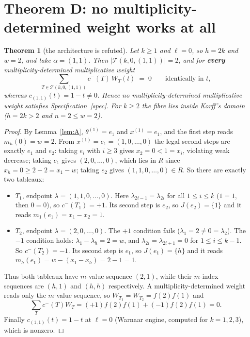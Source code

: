 \documentclass[11pt]{article}
\theoremstyle{plain}
\newtheorem{theorem}{Theorem}
\theoremstyle{definition}
\theoremstyle{remark}
\newcommand{\cm}{c^{-}}
\begin{document}
\section{Theorem D: no multiplicity-determined weight works at all}

\begin{theorem}[the architecture is refuted]\label{thm:D}
Let $k\geq1$ and $\ell=0$, so $h=2k$ and $w=2$, and take $\alpha=(1,1)$. Then
$|\mathcal{T}(k,0,(1,1))|=2$, and for \textbf{every} multiplicity-determined multiplicative
weight
\[
\sum_{T\in\mathcal{T}(k,0,(1,1))}\cm(T)\,W_T(t)\;=\;0\qquad\text{identically in }t,
\]
whereas $c_{(1,1)}(t)=1-t\neq0$. Hence no multiplicity-determined multiplicative weight
satisfies Specification~\ref{spec}. For $k\geq2$ the fibre lies inside Korff's domain
($h=2k>2$ and $n=2\leq w=2$).
\end{theorem}

\begin{proof}
By Lemma~\ref{lem:A}, $\theta^{(1)}=e_1$ and $x^{(1)}=e_1$, and the first step reads
$m_h(0)=w=2$. From $x^{(1)}=e_1=(1,0,\dots,0)$ the legal second steps are exactly $e_1$ and
$e_2$: taking $e_i$ with $i\geq3$ gives $x_2=0<1=x_i$, violating weak decrease; taking
$e_1$ gives $(2,0,\dots,0)$, which lies in $R$ since $x_h=0\geq2-2=x_1-w$; taking $e_2$
gives $(1,1,0,\dots,0)\in R$. So there are exactly two tableaux:
\begin{itemize}
\item $T_1$, endpoint $\lambda=(1,1,0,\dots,0)$. Here $\lambda_{2i-1}=\lambda_{2i}$ for all
$1\le i\le k$ ($1=1$, then $0=0$), so $\cm(T_1)=+1$. Its second step is $e_2$, so
$J(e_2)=\{1\}$ and it reads $m_1(e_1)=x_1-x_2=1$.
\item $T_2$, endpoint $\lambda=(2,0,\dots,0)$. The $+1$ condition fails ($\lambda_1=2\neq
0=\lambda_2$). The $-1$ condition holds: $\lambda_1-\lambda_h=2=w$, and
$\lambda_{2i}=\lambda_{2i+1}=0$ for $1\leq i\leq k-1$. So $\cm(T_2)=-1$. Its second step is
$e_1$, so $J(e_1)=\{h\}$ and it reads $m_h(e_1)=w-(x_1-x_h)=2-1=1$.
\end{itemize}
Thus both tableaux have $m$-value sequence $(2,1)$, while their $m$-index sequences are
$(h,1)$ and $(h,h)$ respectively. A multiplicity-determined weight reads only the $m$-value
sequence, so $W_{T_1}=W_{T_2}=f(2)f(1)$ and
\[
\sum_T\cm(T)W_T=(+1)f(2)f(1)+(-1)f(2)f(1)=0 .
\]
Finally $c_{(1,1)}(t)=1-t$ at $\ell=0$ (Warnaar engine, computed for $k=1,2,3$), which is
nonzero.
\end{proof}
\end{document}
